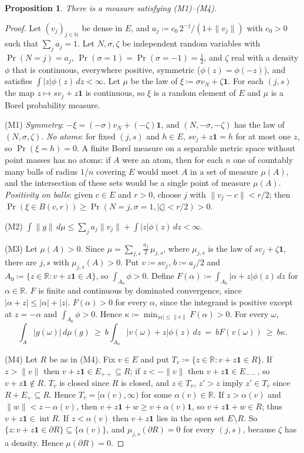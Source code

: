 \documentclass[11pt]{article}
\newtheorem{proposition}[theorem]{Proposition}
\theoremstyle{definition}
\newcommand{\one}{\mathbf 1}
\newcommand{\R}{\mathbb R}
\newcommand{\N}{\mathbb N}
\newcommand{\interior}{\operatorname{int}}
\newcommand{\bd}{\partial}
\begin{document}
\begin{proposition}\label{prop:existence-measure}
There is a measure satisfying (M1)--(M4).
\end{proposition}
\begin{proof}
Let $(v_j)_{j\in\N}$ be dense in $E$, and $a_j\coloneqq c_0\,2^{-j}/(1+\|v_j\|)$ with $c_0>0$ such that $\sum_ja_j=1$. Let $N,\sigma,\zeta$ be independent random variables with $\Pr(N=j)=a_j$, $\Pr(\sigma=1)=\Pr(\sigma=-1)=\tfrac12$, and $\zeta$ real with a density $\phi$ that is continuous, everywhere positive, symmetric ($\phi(z)=\phi(-z)$), and satisfies $\int|z|\phi(z)\,dz<\infty$. Let $\mu$ be the law of $\xi\coloneqq\sigma v_N+\zeta\one$. For each $(j,s)$ the map $z\mapsto sv_j+z\one$ is continuous, so $\xi$ is a random element of $E$ and $\mu$ is a Borel probability measure.

(M1) \emph{Symmetry}: $-\xi=(-\sigma)v_N+(-\zeta)\one$, and $(N,-\sigma,-\zeta)$ has the law of $(N,\sigma,\zeta)$. \emph{No atoms}: for fixed $(j,s)$ and $h\in E$, $sv_j+z\one=h$ for at most one $z$, so $\Pr(\xi=h)=0$. A finite Borel measure on a separable metric space without point masses has no atoms: if $A$ were an atom, then for each $n$ one of countably many balls of radius $1/n$ covering $E$ would meet $A$ in a set of measure $\mu(A)$, and the intersection of these sets would be a single point of measure $\mu(A)$. \emph{Positivity on balls}: given $c\in E$ and $r>0$, choose $j$ with $\|v_j-c\|<r/2$; then $\Pr(\xi\in B(c,r))\ge\Pr(N=j,\sigma=1,|\zeta|<r/2)>0$.

(M2) $\int\|g\|\,d\mu\le\sum_ja_j\|v_j\|+\int|z|\phi(z)\,dz<\infty$.

(M3) Let $\mu(A)>0$. Since $\mu=\sum_{j,s}\tfrac{a_j}2\,\mu_{j,s}$, where $\mu_{j,s}$ is the law of $sv_j+\zeta\one$, there are $j,s$ with $\mu_{j,s}(A)>0$. Put $v\coloneqq sv_j$, $b\coloneqq a_j/2$ and $A_0\coloneqq\{z\in\R:v+z\one\in A\}$, so $\int_{A_0}\phi>0$. Define $F(\alpha)\coloneqq\int_{A_0}|\alpha+z|\phi(z)\,dz$ for $\alpha\in\R$. $F$ is finite and continuous by dominated convergence, since $|\alpha+z|\le|\alpha|+|z|$. $F(\alpha)>0$ for every $\alpha$, since the integrand is positive except at $z=-\alpha$ and $\int_{A_0}\phi>0$. Hence $\kappa\coloneqq\min_{|\alpha|\le\|v\|}F(\alpha)>0$. For every $\omega$,
\[
\int_A|g(\omega)|\,d\mu(g)\ \ge\ b\int_{A_0}|v(\omega)+z|\phi(z)\,dz\ =\ bF(v(\omega))\ \ge\ b\kappa.
\]

(M4) Let $R$ be as in (M4). Fix $v\in E$ and put $T_v\coloneqq\{z\in\R:v+z\one\in R\}$. If $z>\|v\|$ then $v+z\one\in E_{++}\subseteq R$; if $z<-\|v\|$ then $v+z\one\in E_{--}$, so $v+z\one\notin R$. $T_v$ is closed since $R$ is closed, and $z\in T_v$, $z'>z$ imply $z'\in T_v$ since $R+E_+\subseteq R$. Hence $T_v=[\alpha(v),\infty)$ for some $\alpha(v)\in\R$. If $z>\alpha(v)$ and $\|w\|<z-\alpha(v)$, then $v+z\one+w\ge v+\alpha(v)\one$, so $v+z\one+w\in R$; thus $v+z\one\in\interior R$. If $z<\alpha(v)$ then $v+z\one$ lies in the open set $E\setminus R$. So $\{z:v+z\one\in\bd R\}\subseteq\{\alpha(v)\}$, and $\mu_{j,s}(\bd R)=0$ for every $(j,s)$, because $\zeta$ has a density. Hence $\mu(\bd R)=0$.
\end{proof}
\end{document}
